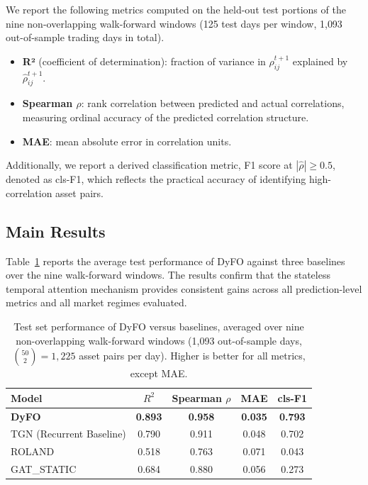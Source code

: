 \documentclass[runningheads]{llncs}
\begin{document}
We report the following metrics computed on the held-out test portions of the nine non-overlapping walk-forward windows (125 test days per window, 1{,}093 out-of-sample trading days in total).


\begin{itemize}
\tightlist
\item
  \textbf{R²} (coefficient of determination): fraction of variance in   \(\rho_{ij}^{t+1}\) explained by \(\hat{\rho}_{ij}^{t+1}\).
\item
  \textbf{Spearman \(\rho\)}: rank correlation between predicted and actual correlations, measuring ordinal accuracy of the predicted correlation structure.
\item
  \textbf{MAE}: mean absolute error in correlation units.
\end{itemize}

Additionally, we report a derived classification metric, F1 score at $|\hat{\rho}| \geq 0.5$, denoted as cls-F1, which reflects the practical accuracy of identifying high-correlation asset pairs.

\subsection{Main Results}\label{main-results-1}

\noindent Table~\ref{tab:dyfo_results} reports the average test performance of DyFO against three baselines over the nine walk-forward windows. The results confirm that the stateless temporal attention mechanism provides consistent gains across all prediction-level metrics and all market regimes evaluated.

\begin{table}[ht]
\caption{Test set performance of DyFO versus baselines, averaged over nine non-overlapping walk-forward windows (1{,}093 out-of-sample days, $\binom{50}{2} = 1{,}225$ asset pairs per day). Higher is better for all metrics, except MAE.}
\label{tab:dyfo_results}
\centering
\begin{tabular}{|l|c|c|c|c|}
\hline
\textbf{Model} & \textbf{$R^2$} & \textbf{Spearman $\rho$} & \textbf{MAE} & \textbf{cls-F1} \\
\hline
\textbf{DyFO} & \textbf{0.893} & \textbf{0.958} & \textbf{0.035} & \textbf{0.793} \\
TGN (Recurrent Baseline) & 0.790 & 0.911 & 0.048 & 0.702 \\
ROLAND & 0.518 & 0.763 & 0.071 & 0.043 \\
GAT\_STATIC & 0.684 & 0.880 & 0.056 & 0.273 \\
\hline
\end{tabular}
\end{table}
\end{document}
